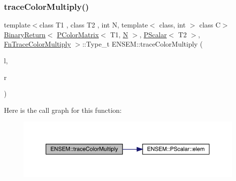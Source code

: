 \subsubsection{\texorpdfstring{traceColorMultiply()}{traceColorMultiply()}\hspace{0.1cm}{\footnotesize\ttfamily [2/3]}}
{\footnotesize\ttfamily template$<$class T1 , class T2 , int N, template$<$ class, int $>$ class C$>$ \\
\mbox{\hyperlink{structENSEM_1_1BinaryReturn}{Binary\+Return}}$<$ \mbox{\hyperlink{classENSEM_1_1PColorMatrix}{P\+Color\+Matrix}}$<$ T1, \mbox{\hyperlink{operator__name__util_8cc_a7722c8ecbb62d99aee7ce68b1752f337}{N}} $>$, \mbox{\hyperlink{classENSEM_1_1PScalar}{P\+Scalar}}$<$ T2 $>$, \mbox{\hyperlink{structENSEM_1_1FnTraceColorMultiply}{Fn\+Trace\+Color\+Multiply}} $>$\+::Type\+\_\+t E\+N\+S\+E\+M\+::trace\+Color\+Multiply (\begin{DoxyParamCaption}\item[{const \mbox{\hyperlink{classENSEM_1_1PColorMatrix}{P\+Color\+Matrix}}$<$ T1, \mbox{\hyperlink{operator__name__util_8cc_a7722c8ecbb62d99aee7ce68b1752f337}{N}} $>$ \&}]{l,  }\item[{const \mbox{\hyperlink{classENSEM_1_1PScalar}{P\+Scalar}}$<$ T2 $>$ \&}]{r }\end{DoxyParamCaption})\hspace{0.3cm}{\ttfamily [inline]}}

Here is the call graph for this function\+:\nopagebreak
\begin{figure}[H]
\begin{center}
\leavevmode
\includegraphics[width=350pt]{dd/d2f/group__primcolormatrix_gac1ebb50e5da5705b401fc6a361b951c5_cgraph}
\end{center}
\end{figure}
\mbox{\label{group__primcolormatrix_ga0e0db533c0e6dc778fc9f271537b96eb}} 
